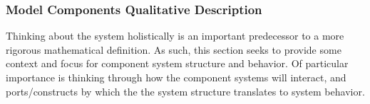 \documentclass[10pt]{article}
\begin{document}


\subsubsection{Model Components Qualitative Description}

Thinking about the system holistically is an important predecessor to a more rigorous mathematical definition.  As such, this section seeks to provide some context and focus for component system structure and behavior.  Of particular importance is thinking through how the component systems will interact, and ports/constructs by which the the system structure translates to system behavior.
\end{document}
